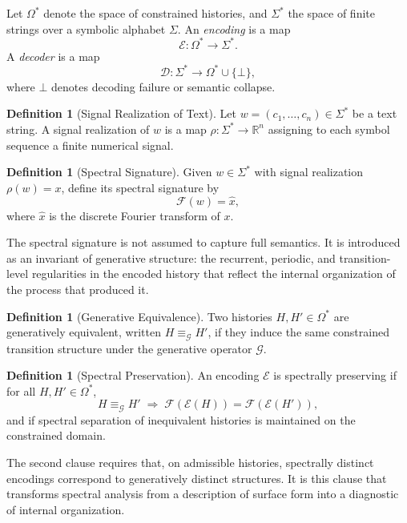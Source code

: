 \documentclass[12pt, a4paper]{article}
\theoremstyle{plain}
\theoremstyle{definition}
\newtheorem{definition}[theorem]{Definition}
\theoremstyle{remark}
\begin{document}
Let $\Omega^*$ denote the space of constrained histories, and $\Sigma^*$ the space of finite strings over a symbolic alphabet $\Sigma$. An \emph{encoding} is a map
\[
\mathcal{E} : \Omega^* \to \Sigma^*.
\]
A \emph{decoder} is a map
\[
\mathcal{D} : \Sigma^* \to \Omega^* \cup \{\bot\},
\]
where $\bot$ denotes decoding failure or semantic collapse.

\begin{definition}[Signal Realization of Text]
Let $w = (c_1, \dots, c_n) \in \Sigma^*$ be a text string. A signal realization of $w$ is a map $\rho : \Sigma^* \to \mathbb{R}^n$ assigning to each symbol sequence a finite numerical signal.
\end{definition}

\begin{definition}[Spectral Signature]
Given $w \in \Sigma^*$ with signal realization $\rho(w) = x$, define its spectral signature by
\[
\mathcal{F}(w) = \hat{x},
\]
where $\hat{x}$ is the discrete Fourier transform of $x$.
\end{definition}

The spectral signature is not assumed to capture full semantics. It is introduced as an invariant of generative structure: the recurrent, periodic, and transition-level regularities in the encoded history that reflect the internal organization of the process that produced it.

\begin{definition}[Generative Equivalence]
Two histories $H, H' \in \Omega^*$ are generatively equivalent, written $H \equiv_{\mathcal{G}} H'$, if they induce the same constrained transition structure under the generative operator $\mathcal{G}$.
\end{definition}

\begin{definition}[Spectral Preservation]
An encoding $\mathcal{E}$ is spectrally preserving if for all $H, H' \in \Omega^*$,
\[
H \equiv_{\mathcal{G}} H' \;\Rightarrow\; \mathcal{F}(\mathcal{E}(H)) = \mathcal{F}(\mathcal{E}(H')),
\]
and if spectral separation of inequivalent histories is maintained on the constrained domain.
\end{definition}

The second clause requires that, on admissible histories, spectrally distinct encodings correspond to generatively distinct structures. It is this clause that transforms spectral analysis from a description of surface form into a diagnostic of internal organization.
\end{document}

